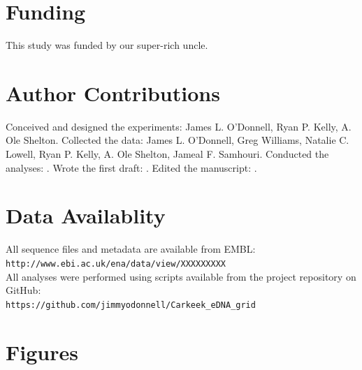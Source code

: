 \documentclass[11pt,letterpaper]{article} %
\begin{document}
\section*{Funding}
This study was funded by our super-rich uncle.

\section*{Author Contributions}
Conceived and designed the experiments: James L. O'Donnell, Ryan P. Kelly, A. Ole Shelton.
Collected the data: James L. O'Donnell, Greg Williams, Natalie C. Lowell, Ryan P. Kelly, A. Ole Shelton, Jameal F. Samhouri.
Conducted the analyses: .
Wrote the first draft: .
Edited the manuscript: .


\section*{Data Availablity}
All sequence files and metadata are available from EMBL:\\ \verb!http://www.ebi.ac.uk/ena/data/view/XXXXXXXXX! \\
All analyses were performed using scripts available from the project repository on GitHub:\\  \verb!https://github.com/jimmyodonnell/Carkeek_eDNA_grid!\\



\section*{Figures}
\end{document}
